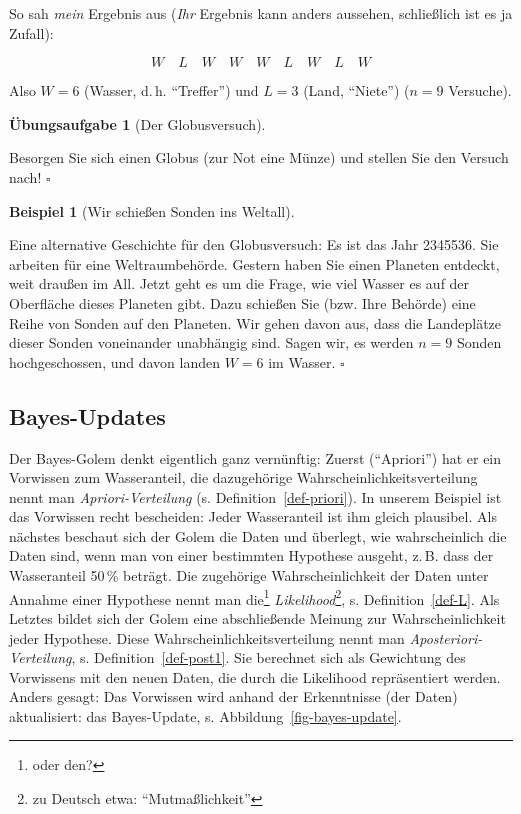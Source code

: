 \documentclass[
  ngerman,
  letterpaper,
  twoside,
  open=any]{scrbook}
\theoremstyle{definition}
\newtheorem{example}{Beispiel}[chapter]
\theoremstyle{plain}
\theoremstyle{definition}
\newtheorem{exercise}{Übungsaufgabe}[chapter]
\theoremstyle{definition}
\theoremstyle{definition}
\newtheorem{example}{Beispiel}[chapter]
\theoremstyle{definition}
\newtheorem{exercise}{Übungsaufgabe}[chapter]
\theoremstyle{remark}
\begin{document}
So sah \emph{mein} Ergebnis aus (\emph{Ihr} Ergebnis kann anders
aussehen, schließlich ist es ja Zufall):

\[W \quad L \quad W \quad W \quad W \quad L \quad W \quad L \quad W\]

Also \(W=6\) (Wasser, d.\,h. \enquote{Treffer}) und \(L=3\) (Land,
\enquote{Niete}) (\(n=9\) Versuche).

\begin{exercise}[Der
Globusversuch]\protect\hypertarget{exr-globe1}{}\label{exr-globe1}

Besorgen Sie sich einen Globus (zur Not eine Münze) und stellen Sie den
Versuch nach! \(\square\)

\end{exercise}

\begin{example}[Wir schießen Sonden ins
Weltall]\protect\hypertarget{exm-sonde-im-all}{}\label{exm-sonde-im-all}

Eine alternative Geschichte für den Globusversuch: Es ist das Jahr
2345536. Sie arbeiten für eine Weltraumbehörde. Gestern haben Sie einen
Planeten entdeckt, weit draußen im All. Jetzt geht es um die Frage, wie
viel Wasser es auf der Oberfläche dieses Planeten gibt. Dazu schießen
Sie (bzw. Ihre Behörde) eine Reihe von Sonden auf den Planeten. Wir
gehen davon aus, dass die Landeplätze dieser Sonden voneinander
unabhängig sind. Sagen wir, es werden \(n=9\) Sonden hochgeschossen, und
davon landen \(W=6\) im Wasser. \(\square\)

\end{example}

\subsection{Bayes-Updates}\label{bayes-updates}

Der Bayes-Golem denkt eigentlich ganz vernünftig: Zuerst
(\enquote{Apriori}) hat er ein Vorwissen zum Wasseranteil, die
dazugehörige Wahrscheinlichkeitsverteilung nennt man
\emph{Apriori-Verteilung} (s. Definition~\ref{def-priori}). In unserem
Beispiel ist das Vorwissen recht bescheiden: Jeder Wasseranteil ist ihm
gleich plausibel. Als nächstes beschaut sich der Golem die Daten und
überlegt, wie wahrscheinlich die Daten sind, wenn man von einer
bestimmten Hypothese ausgeht, z.\,B. dass der Wasseranteil 50\,\%
beträgt. Die zugehörige Wahrscheinlichkeit der Daten unter Annahme einer
Hypothese nennt man die\footnote{oder den?}
\emph{Likelihood}\footnote{zu Deutsch etwa: \enquote{Mutmaßlichkeit}},
s. Definition~\ref{def-L}. Als Letztes bildet sich der Golem eine
abschließende Meinung zur Wahrscheinlichkeit jeder Hypothese. Diese
Wahrscheinlichkeitsverteilung nennt man \emph{Aposteriori-Verteilung},
s. Definition~\ref{def-post1}. Sie berechnet sich als Gewichtung des
Vorwissens mit den neuen Daten, die durch die Likelihood repräsentiert
werden. Anders gesagt: Das Vorwissen wird anhand der Erkenntnisse (der
Daten) aktualisiert: das Bayes-Update, s.
Abbildung~\ref{fig-bayes-update}.
\end{document}
